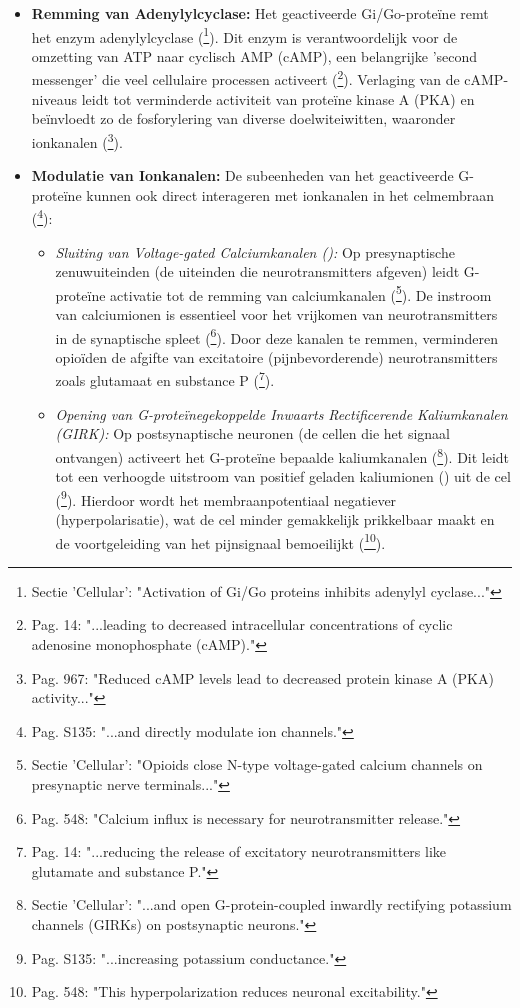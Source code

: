 \documentclass[11pt, a4paper]{report} %
\begin{document}
\begin{itemize}
    \item \textbf{Remming van Adenylylcyclase:} Het geactiveerde Gi/Go-proteïne remt het enzym adenylylcyclase (\cite{StatPearlsOpioidReceptor}\footnote{Sectie 'Cellular': "Activation of Gi/Go proteins inhibits adenylyl cyclase..."}). Dit enzym is verantwoordelijk voor de omzetting van ATP naar cyclisch AMP (cAMP), een belangrijke 'second messenger' die veel cellulaire processen activeert (\cite{Kosten2002NeurobiologyDependence}\footnote{Pag. 14: "...leading to decreased intracellular concentrations of cyclic adenosine monophosphate (cAMP)."}). Verlaging van de cAMP-niveaus leidt tot verminderde activiteit van proteïne kinase A (PKA) en beïnvloedt zo de fosforylering van diverse doelwiteiwitten, waaronder ionkanalen (\cite{Shang2020MolecularBasis}\footnote{Pag. 967: "Reduced cAMP levels lead to decreased protein kinase A (PKA) activity..."}).
    \item \textbf{Modulatie van Ionkanalen:} De subeenheden van het geactiveerde G-proteïne kunnen ook direct interageren met ionkanalen in het celmembraan (\cite{Trescot2008OpioidPharm}\footnote{Pag. S135: "...and directly modulate ion channels."}):
        \begin{itemize}
            \item \textit{Sluiting van Voltage-gated Calciumkanalen ():} Op presynaptische zenuwuiteinden (de uiteinden die neurotransmitters afgeven) leidt G-proteïne activatie tot de remming van calciumkanalen (\cite{StatPearlsOpioidReceptor}\footnote{Sectie 'Cellular': "Opioids close N-type voltage-gated calcium channels on presynaptic nerve terminals..."}). De instroom van calciumionen is essentieel voor het vrijkomen van neurotransmitters in de synaptische spleet (\cite{GutsteinAkil2006OpioidAnalgesics}\footnote{Pag. 548: "Calcium influx is necessary for neurotransmitter release."}). Door deze kanalen te remmen, verminderen opioïden de afgifte van excitatoire (pijnbevorderende) neurotransmitters zoals glutamaat en substance P (\cite{Kosten2002NeurobiologyDependence}\footnote{Pag. 14: "...reducing the release of excitatory neurotransmitters like glutamate and substance P."}).
            \item \textit{Opening van G-proteïnegekoppelde Inwaarts Rectificerende Kaliumkanalen (GIRK):} Op postsynaptische neuronen (de cellen die het signaal ontvangen) activeert het G-proteïne bepaalde kaliumkanalen (\cite{StatPearlsOpioidReceptor}\footnote{Sectie 'Cellular': "...and open G-protein-coupled inwardly rectifying potassium channels (GIRKs) on postsynaptic neurons."}). Dit leidt tot een verhoogde uitstroom van positief geladen kaliumionen () uit de cel (\cite{Trescot2008OpioidPharm}\footnote{Pag. S135: "...increasing potassium conductance."}). Hierdoor wordt het membraanpotentiaal negatiever (hyperpolarisatie), wat de cel minder gemakkelijk prikkelbaar maakt en de voortgeleiding van het pijnsignaal bemoeilijkt (\cite{GutsteinAkil2006OpioidAnalgesics}\footnote{Pag. 548: "This hyperpolarization reduces neuronal excitability."}).
        \end{itemize}
\end{itemize}
\end{document}
